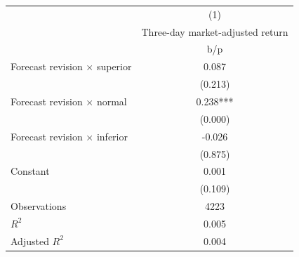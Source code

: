 {
\def\sym#1{\ifmmode^{#1}\else\(^{#1}\)\fi}
\begin{tabular}{l*{1}{c}}
\hline\hline
                    &\multicolumn{1}{c}{(1)}\\
                    &\multicolumn{1}{c}{Three-day market-adjusted return}\\
                    &         b/p   \\
\hline
Forecast revision × superior&       0.087   \\
                    &     (0.213)   \\
Forecast revision × normal&       0.238***\\
                    &     (0.000)   \\
Forecast revision × inferior&      -0.026   \\
                    &     (0.875)   \\
Constant            &       0.001   \\
                    &     (0.109)   \\
\hline
Observations        &        4223   \\
\(R^{2}\)           &       0.005   \\
Adjusted \(R^{2}\)  &       0.004   \\
\hline\hline
\end{tabular}
}
